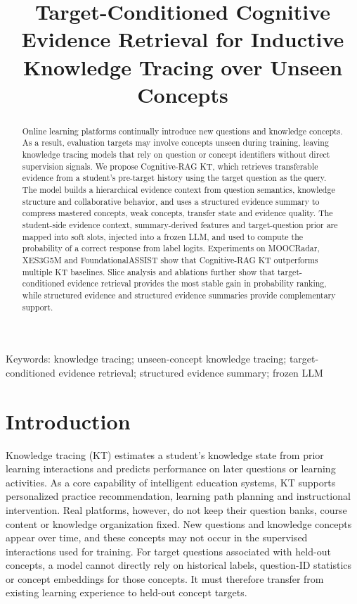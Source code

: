 \documentclass[a4paper,12pt]{article}
\title{Target-Conditioned Cognitive Evidence Retrieval for Inductive Knowledge Tracing over Unseen Concepts}
\author{}
\date{}
\numberwithin{table}{section}
\begin{document}
\maketitle

\begin{abstract}
Online learning platforms continually introduce new questions and knowledge concepts. As a result, evaluation targets may involve concepts unseen during training, leaving knowledge tracing models that rely on question or concept identifiers without direct supervision signals. We propose Cognitive-RAG KT, which retrieves transferable evidence from a student's pre-target history using the target question as the query. The model builds a hierarchical evidence context from question semantics, knowledge structure and collaborative behavior, and uses a structured evidence summary to compress mastered concepts, weak concepts, transfer state and evidence quality. The student-side evidence context, summary-derived features and target-question prior are mapped into soft slots, injected into a frozen LLM, and used to compute the probability of a correct response from label logits. Experiments on MOOCRadar, XES3G5M and FoundationalASSIST show that Cognitive-RAG KT outperforms multiple KT baselines. Slice analysis and ablations further show that target-conditioned evidence retrieval provides the most stable gain in probability ranking, while structured evidence and structured evidence summaries provide complementary support.
\end{abstract}

\noindent Keywords: knowledge tracing; unseen-concept knowledge tracing; target-conditioned evidence retrieval; structured evidence summary; frozen LLM

\section{Introduction}

Knowledge tracing (KT) estimates a student's knowledge state from prior learning interactions and predicts performance on later questions or learning activities. As a core capability of intelligent education systems, KT supports personalized practice recommendation, learning path planning and instructional intervention. Real platforms, however, do not keep their question banks, course content or knowledge organization fixed. New questions and knowledge concepts appear over time, and these concepts may not occur in the supervised interactions used for training. For target questions associated with held-out concepts, a model cannot directly rely on historical labels, question-ID statistics or concept embeddings for those concepts. It must therefore transfer from existing learning experience to held-out concept targets.
\end{document}
